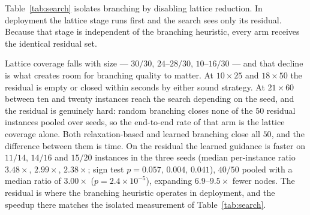 \documentclass[preprint,12pt]{elsarticle}
\begin{document}
Table~\ref{tab:search} isolates branching by disabling lattice reduction. In deployment the lattice stage runs first and the search sees only its residual. Because that stage is independent of the branching heuristic, every arm receives the identical residual set.

\begin{table}[h]
\centering
{}
\caption{Cascade results on the warm-started loop, three seeds at every size, $600$\,s budget at $21\times60$. Lattice coverage varies across seeds ($16$, $14$, $10$ of $30$ at $21\times60$) because the lattice stage draws random column permutations, so the residual handed to the search varies with it; all arms within a seed receive the identical residual.}
\label{tab:cascade}
\end{table}

Lattice coverage falls with size --- $30/30$, $24$--$28/30$, $10$--$16/30$ --- and that decline is what creates room for branching quality to matter. At $10\times25$ and $18\times50$ the residual is empty or closed within seconds by either sound strategy. At $21\times60$ between ten and twenty instances reach the search depending on the seed, and the residual is genuinely hard: random branching closes none of the $50$ residual instances pooled over seeds, so the end-to-end rate of that arm is the lattice coverage alone. Both relaxation-based and learned branching close all $50$, and the difference between them is time. On the residual the learned guidance is faster on $11/14$, $14/16$ and $15/20$ instances in the three seeds (median per-instance ratio $3.48\times$, $2.99\times$, $2.38\times$; sign test $p=0.057$, $0.004$, $0.041$), $40/50$ pooled with a median ratio of $3.00\times$ ($p=2.4\times10^{-5}$), expanding $6.9$--$9.5\times$ fewer nodes. The residual is where the branching heuristic operates in deployment, and the speedup there matches the isolated measurement of Table~\ref{tab:search}.
\end{document}
